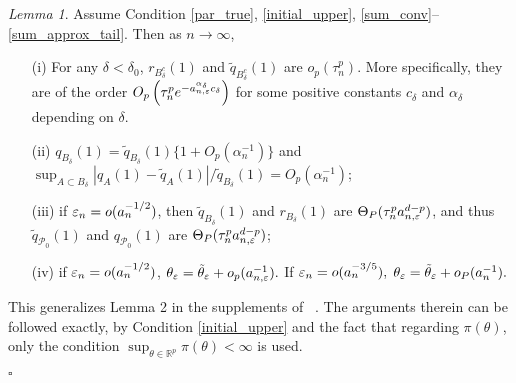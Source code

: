 \documentclass[9pt]{article}
\theoremstyle{remark}
\newtheorem{lemma}{Lemma}
\begin{document}
\begin{lemma}\label{Alemma3.5} Assume Condition \ref{par_true}, \ref{initial_upper}, \ref{sum_conv}--\ref{sum_approx_tail}. Then as $n\rightarrow\infty$, 
	\begin{enumerate}
		\item[(i)] For any $\delta<\delta_{0}$, $r_{B_{\delta}^{c}}(1)$ and $\tilde{q}_{B_{\delta}^{c}}(1)$
		are $o_{p}(\tau_{n}^{p})$. More specifically, they are of the order
		$O_{p}\left(\tau_{n}^{p}e^{-a_{n,\varepsilon}^{\alpha_{\delta}}c_{\delta}}\right)$
		for some positive constants $c_{\delta}$ and $\alpha_{\delta}$ depending
		on $\delta$.
		\item[(ii)] $q_{B_{\delta}}(1)=\tilde{q}_{B_{\delta}}(1)\{1+O_{p}(\alpha_{n}^{-1})\}$
		and $\sup_{A\subset B_{\delta}}|q_{A}(1)-\tilde{q}_{A}(1)|/\tilde{q}_{B_{\delta}}(1)=O_{p}(\alpha_{n}^{-1})$; 
		\item[(iii)] if $\varepsilon_{n}=o(a_{n}^{-1/2})$, then $\tilde{q}_{B_{\delta}}(1)$ and
		$r_{B_{\delta}}(1)$ are $\Theta_{P}(\tau_{n}^{p}a_{n,\varepsilon}^{d-p})$,
		and thus $\tilde{q}_{\mathcal{P}_{0}}(1)$ and $q_{\mathcal{P}_{0}}(1)$
		are $\Theta_{P}(\tau_{n}^{p}a_{n,\varepsilon}^{d-p})$; 
		\item[(iv)] if $\varepsilon_{n}=o(a_{n}^{-1/2})$, $\theta_{\varepsilon}=\tilde{\theta}_{\varepsilon}+o_{p}(a_{n,\varepsilon}^{-1}).$
		If $\varepsilon_{n}=o(a_{n}^{-3/5}),$ $\theta_{\varepsilon}=\tilde{\theta}_{\varepsilon}+o_{P}(a_{n}^{-1}).$
	\end{enumerate} \end{lemma}
	This generalizes Lemma 2 in the supplements of ~\cite{Li2017}. The arguments therein
	can be followed exactly, by Condition \ref{initial_upper} and the fact that regarding $\pi(\theta)$,
	only the condition $\sup_{\theta\in\mathbb{R}^{p}}\pi(\theta)<\infty$
	is used.
	
	\hfill{$\square$} 
	
\end{document}
